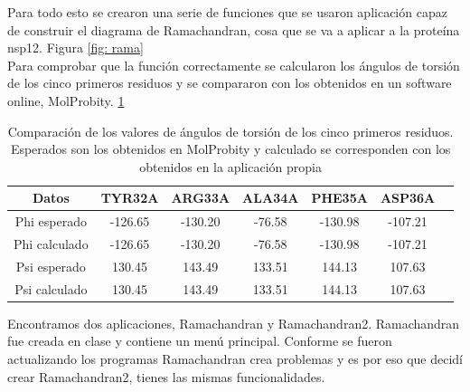 \documentclass[a4paper,11pt]{report}
\begin{document}
 Para todo esto se crearon una serie de funciones que se usaron aplicación capaz de construir el diagrama de Ramachandran, cosa que se va a aplicar a la proteína nsp12. Figura \ref{fig: rama}
 \\Para comprobar que la función correctamente se calcularon los ángulos de torsión de los cinco primeros residuos y se compararon con los obtenidos en un software online, MolProbity. \ref{tab: rama}
 \begin{table}[h!]
 	
 	\begin{tabular}{|c|c|c|c|c|c|c|}
 		\hline
 		Datos&TYR32A &ARG33A &ALA34A&PHE35A&ASP36A \\
 		\hline
 		Phi esperado&-126.65&-130.20&-76.58&-130.98&-107.21 \\
 		\hline
 		Phi calculado&-126.65&-130.20&-76.58&-130.98&-107.21 \\
 		\hline
 		Psi esperado&130.45&143.49&133.51&144.13&107.63 \\
 		\hline
 		Psi calculado&130.45&143.49&133.51&144.13&107.63 \\
 		\hline
 		
 	\end{tabular}
 	\caption{Comparación de los valores de ángulos de torsión de los cinco primeros residuos. Esperados son los obtenidos en MolProbity y calculado se corresponden con los obtenidos en la aplicación propia }
 	\label{tab: rama}
 \end{table}
 
Encontramos dos aplicaciones, Ramachandran y Ramachandran2. Ramachandran fue creada en clase y contiene un menú principal. Conforme se fueron actualizando los programas Ramachandran crea problemas y es por eso que decidí crear Ramachandran2, tienes las mismas funcionalidades.
\end{document}
